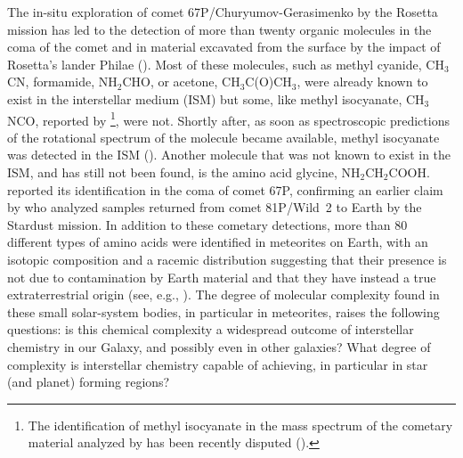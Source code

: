 \documentclass{iau}
\begin{document}
The in-situ exploration of comet 67P/Churyumov-Gerasimenko by the Rosetta
mission has led to the detection of more than twenty organic molecules in 
the coma of the comet and in material excavated from the surface by the impact 
of Rosetta's lander Philae (\cite{Goesmann15,Altwegg16,Altwegg17}). Most of 
these molecules, such as methyl cyanide, CH$_3$CN, formamide, NH$_2$CHO, or 
acetone, CH$_3$C(O)CH$_3$, were already known to exist in the interstellar 
medium (ISM) but some, like methyl isocyanate, CH$_3$NCO, reported by 
\cite{Goesmann15}\footnote{The identification of methyl isocyanate in the mass
spectrum of the cometary material analyzed by \cite{Goesmann15} has been 
recently disputed (\cite{Ligterink17,Altwegg17}).}, were not. Shortly after, 
as soon as spectroscopic 
predictions of the rotational spectrum of the molecule became available, 
methyl isocyanate was detected in the ISM (\cite{Halfen15,Cernicharo16}).
Another molecule that was not known to exist in the ISM, and has still not 
been found, is the amino acid glycine, NH$_2$CH$_2$COOH. \cite{Altwegg16} 
reported its identification in the coma of 
comet 67P, confirming an earlier claim by \cite{Elsila09} who analyzed samples 
returned from comet 81P/Wild~2 to Earth by the Stardust mission.
In addition to these cometary detections, more than 80 different types of 
amino acids were identified in meteorites on Earth, with an isotopic 
composition and a racemic distribution suggesting that their presence is not
due to contamination by Earth material and that they have instead a true 
extraterrestrial origin (see, e.g., \cite{Botta02}).
The degree of molecular complexity found in these small solar-system bodies, 
in particular in meteorites, raises the following questions: is this chemical 
complexity a widespread outcome of interstellar chemistry in our Galaxy, 
and possibly even in other galaxies? What degree of complexity is interstellar 
chemistry capable of achieving, in particular in star (and planet) forming 
regions? 
\end{document}
